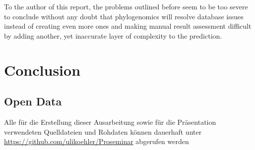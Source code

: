 \documentclass[pdftex,paper=A4,DIV=calc,titlepage,12pt]{scrartcl}
\newtheorem[L]{boxedDefinition}{Definition}
\begin{document}
To the author of this report, the problems outlined before seem to be too severe to conclude without any doubt that phylogenomics will resolve database issues instead of creating even more ones and making manual result assessment difficult by adding another,  yet inaccurate layer of complexity to the prediction.

\section{Conclusion}

\renewcommand\refname{Bibliography}


\subsection*{Open Data}\label{opendata}
Alle für die Erstellung dieser Ausarbeitung sowie für die Präsentation verwendeten Quelldateien und Rohdaten können dauerhaft unter \url{https://github.com/ulikoehler/Proseminar} abgerufen werden
\end{document}
